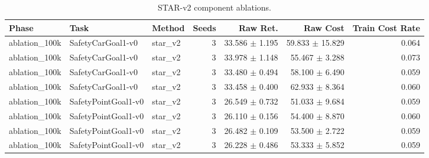 \begin{table}[t]
\centering
\caption{STAR-v2 component ablations.}
\label{tab:star-v2-components}
\begin{tabular}{lllrrrr}
\toprule
Phase & Task & Method & Seeds & Raw Ret. & Raw Cost & Train Cost Rate \\
\midrule
ablation_100k & SafetyCarGoal1-v0 & star_v2 & 3 & 33.586 $\pm$ 1.195 & 59.833 $\pm$ 15.829 & 0.064 \\
ablation_100k & SafetyCarGoal1-v0 & star_v2 & 3 & 33.978 $\pm$ 1.148 & 55.467 $\pm$ 3.288 & 0.073 \\
ablation_100k & SafetyCarGoal1-v0 & star_v2 & 3 & 33.480 $\pm$ 0.494 & 58.100 $\pm$ 6.490 & 0.059 \\
ablation_100k & SafetyCarGoal1-v0 & star_v2 & 3 & 33.458 $\pm$ 0.400 & 62.933 $\pm$ 8.364 & 0.060 \\
ablation_100k & SafetyPointGoal1-v0 & star_v2 & 3 & 26.549 $\pm$ 0.732 & 51.033 $\pm$ 9.684 & 0.059 \\
ablation_100k & SafetyPointGoal1-v0 & star_v2 & 3 & 26.110 $\pm$ 0.156 & 54.400 $\pm$ 8.870 & 0.060 \\
ablation_100k & SafetyPointGoal1-v0 & star_v2 & 3 & 26.482 $\pm$ 0.109 & 53.500 $\pm$ 2.722 & 0.059 \\
ablation_100k & SafetyPointGoal1-v0 & star_v2 & 3 & 26.228 $\pm$ 0.486 & 53.333 $\pm$ 5.852 & 0.059 \\
\bottomrule
\end{tabular}
\end{table}
